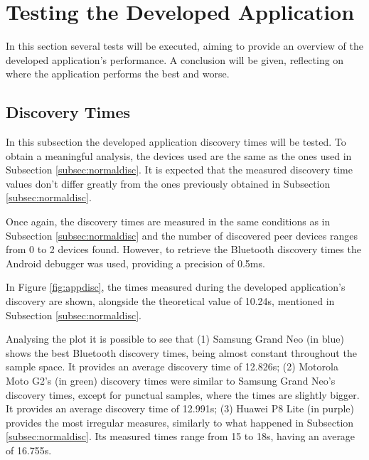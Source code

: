\section{Testing the Developed Application}

In this section several tests will be executed, aiming to provide an overview of the developed application's performance. A conclusion will be given, reflecting on where the application performs the best and worse.

\subsection{Discovery Times}
\label{subsec:appdisc}

In this subsection the developed application discovery times will be tested. To obtain a meaningful analysis, the devices used are the same as the ones used in Subsection \ref{subsec:normaldisc}. It is expected that the measured discovery time values don't differ greatly from the ones previously obtained in Subsection \ref{subsec:normaldisc}.

Once again, the discovery times are measured in the same conditions as in Subsection \ref{subsec:normaldisc} and the number of discovered peer devices ranges from 0 to 2 devices found. However, to retrieve the Bluetooth discovery times the Android debugger was used, providing a precision of 0.5ms.

In Figure \ref{fig:appdisc}, the times measured during the developed application's discovery are shown, alongside the theoretical value of 10.24s, mentioned in Subsection \ref{subsec:normaldisc}.

Analysing the plot it is possible to see that (1) Samsung Grand Neo (in blue) shows the best Bluetooth discovery times, being almost constant throughout the sample space. It provides an average discovery time of 12.826s; (2) Motorola Moto G2's (in green) discovery times were similar to Samsung Grand Neo's discovery times, except for punctual samples, where the times are slightly bigger. It provides an average discovery time of 12.991s; (3) Huawei P8 Lite (in purple) provides the most irregular measures, similarly to what happened in Subsection \ref{subsec:normaldisc}. Its measured times range from 15 to 18s, having an average of 16.755s.

